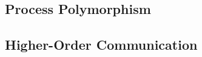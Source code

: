 \subsection{Process Polymorphism}
\label{sec:process-poly}

\subsection{Higher-Order Communication}
\label{sec:higher-order-comm}
